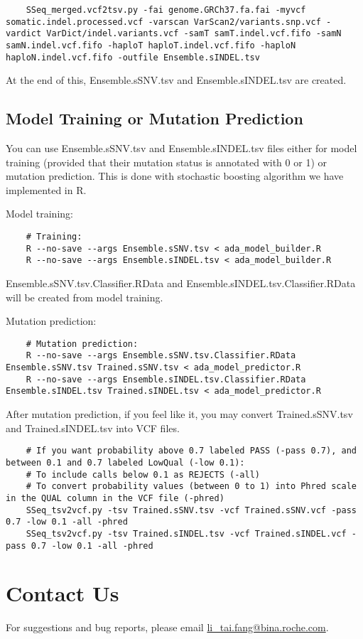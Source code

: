 \documentclass[10pt,letterpaper]{article}
\begin{document}
\begin{sloppypar}
\begin{lstlisting}
	SSeq_merged.vcf2tsv.py -fai genome.GRCh37.fa.fai -myvcf somatic.indel.processed.vcf -varscan VarScan2/variants.snp.vcf -vardict VarDict/indel.variants.vcf -samT samT.indel.vcf.fifo -samN samN.indel.vcf.fifo -haploT haploT.indel.vcf.fifo -haploN haploN.indel.vcf.fifo -outfile Ensemble.sINDEL.tsv
	\end{lstlisting}

	
	At the end of this, Ensemble.sSNV.tsv and Ensemble.sINDEL.tsv are created. 



	\subsection{Model Training or Mutation Prediction}

	You can use Ensemble.sSNV.tsv and Ensemble.sINDEL.tsv files either for model training (provided that their mutation status is annotated with 0 or 1) or mutation prediction. This is done with stochastic boosting algorithm we have implemented in R. 
	
	Model training:
	\begin{lstlisting}
	# Training:
	R --no-save --args Ensemble.sSNV.tsv < ada_model_builder.R
	R --no-save --args Ensemble.sINDEL.tsv < ada_model_builder.R
	\end{lstlisting}
	
	Ensemble.sSNV.tsv.Classifier.RData and Ensemble.sINDEL.tsv.Classifier.RData will be created from model training.
	

	Mutation prediction:
	
	\begin{lstlisting}
	# Mutation prediction:
	R --no-save --args Ensemble.sSNV.tsv.Classifier.RData Ensemble.sSNV.tsv Trained.sSNV.tsv < ada_model_predictor.R
	R --no-save --args Ensemble.sINDEL.tsv.Classifier.RData Ensemble.sINDEL.tsv Trained.sINDEL.tsv < ada_model_predictor.R
	\end{lstlisting}

	
	After mutation prediction, if you feel like it, you may convert Trained.sSNV.tsv and Trained.sINDEL.tsv into VCF files. 

	\begin{lstlisting}
	# If you want probability above 0.7 labeled PASS (-pass 0.7), and between 0.1 and 0.7 labeled LowQual (-low 0.1):
	# To include calls below 0.1 as REJECTS (-all)
	# To convert probability values (between 0 to 1) into Phred scale in the QUAL column in the VCF file (-phred)
	SSeq_tsv2vcf.py -tsv Trained.sSNV.tsv -vcf Trained.sSNV.vcf -pass 0.7 -low 0.1 -all -phred
	SSeq_tsv2vcf.py -tsv Trained.sINDEL.tsv -vcf Trained.sINDEL.vcf -pass 0.7 -low 0.1 -all -phred
	\end{lstlisting}





\section{Contact Us}
For suggestions and bug reports, please email \href{mailto:li_tai.fang@bina.roche.com}{ li\_tai.fang@bina.roche.com}.


\end{sloppypar}
\end{document}
